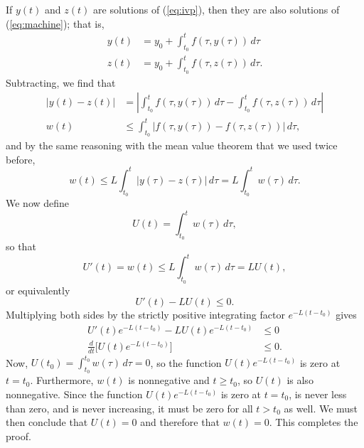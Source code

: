 \documentclass{myart}
\newcommand{\eq}[1]{(\ref{eq:#1})}
\begin{document}
If $y(t)$ and $z(t)$ are solutions of \eq{ivp}, then they are also solutions of \eq{machine}; that is,
\begin{align*}
y(t) &= y_0 + \int_{t_0}^t f(\tau, y(\tau)) \,d\tau \\
z(t) &= y_0 + \int_{t_0}^t f(\tau, z(\tau)) \,d\tau.
\end{align*}
Subtracting, we find that
\begin{align*}
\big|y(t) - z(t)\big| &= \left|\int_{t_0}^t f(\tau, y(\tau)) \,d\tau - \int_{t_0}^t f(\tau, z(\tau)) \,d\tau\right| \\
w(t) &\leq \int_{t_0}^t \Big|f(\tau, y(\tau)) - f(\tau, z(\tau))\Big| \,d\tau,
\end{align*}
and by the same reasoning with the mean value theorem that we used twice before,
\begin{equation*}
w(t) \leq L \int_{t_0}^t \big|y(\tau) - z(\tau)\big| \,d\tau = L \int_{t_0}^t w(\tau) \,d\tau.
\end{equation*}
We now define
\begin{equation*}
U(t) = \int_{t_0}^t w(\tau) \,d\tau,
\end{equation*}
so that
\begin{equation*}
U'(t) = w(t) \leq L \int_{t_0}^t w(\tau) \,d\tau = LU(t),
\end{equation*}
or equivalently
\begin{equation*}
U'(t) - LU(t) \leq 0.
\end{equation*}
Multiplying both sides by the strictly positive integrating factor $e^{-L(t - t_0)}$ gives
\begin{align*}
U'(t) e^{-L(t - t_0)} - LU(t) e^{-L(t - t_0)} &\leq 0 \\
\frac{d}{dt} \Big[U(t) e^{-L(t - t_0)}\Big] &\leq 0.
\end{align*}
Now, $U(t_0) = \int_{t_0}^{t_0} w(\tau) \,d\tau = 0$, so the function $U(t) e^{-L(t - t_0)}$ is zero at $t = t_0$. Furthermore, $w(t)$ is nonnegative and $t \geq t_0$, so $U(t)$ is also nonnegative. Since the function $U(t) e^{-L(t - t_0)}$ is zero at $t = t_0$, is never less than zero, and is never increasing, it must be zero for all $t > t_0$ as well. We must then conclude that $U(t) = 0$ and therefore that $w(t) = 0$. This completes the proof.
\end{document}

